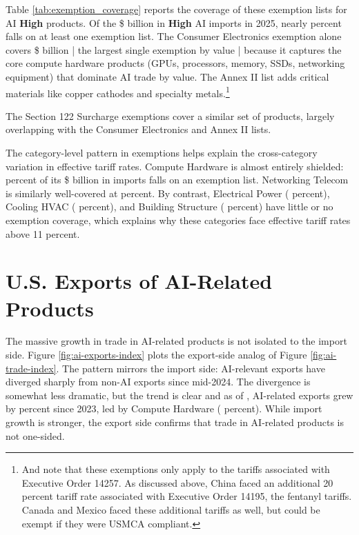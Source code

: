 \documentclass[12pt,pdftex]{article}
\begin{document}
\begin{onehalfspacing}
\afterpage{%
\clearpage

}

Table \ref{tab:exemption_coverage} reports the coverage of these exemption lists for AI \textbf{High} products. Of the \$\highAiTwentyFive{} billion in \textbf{High} AI imports in 2025, nearly \exemptionAnyPct{} percent falls on at least one exemption list. The Consumer Electronics exemption alone covers \$\exemptionCEDollars{} billion | the largest single exemption by value | because it captures the core compute hardware products (GPUs, processors, memory, SSDs, networking equipment) that dominate AI trade by value. The Annex II list adds critical materials like copper cathodes and specialty metals.\footnote{And note that these exemptions only apply to the tariffs associated with Executive Order 14257. As discussed above, China faced an additional 20 percent tariff rate associated with Executive Order 14195, the fentanyl tariffs. Canada and Mexico faced these additional tariffs as well, but could be exempt if they were USMCA compliant.} 

The Section 122 Surcharge exemptions cover a similar set of products, largely overlapping with the Consumer Electronics and Annex II lists.

The category-level pattern in exemptions helps explain the cross-category variation in effective tariff rates. Compute Hardware is almost entirely shielded: \exemptionComputeHardwarePct{} percent of its \$\ComputeHardwareTwentyFive{} billion in imports falls on an exemption list. Networking Telecom is similarly well-covered at \exemptionNetworkingTelecomPct{} percent. By contrast, Electrical Power (\exemptionElectricalPowerPct{} percent), Cooling HVAC (\exemptionCoolingHVACPct{} percent), and Building Structure (\exemptionBuildingStructurePct{} percent) have little or no exemption coverage, which explains why these categories face effective tariff rates above 11 percent.

\section{U.S. Exports of AI-Related Products}\label{sec:facts-exports}

The massive growth in trade in AI-related products is not isolated to the import side. Figure \ref{fig:ai-exports-index} plots the export-side analog of Figure \ref{fig:ai-trade-index}. The pattern mirrors the import side: AI-relevant exports have diverged sharply from non-AI exports since mid-2024. The divergence is somewhat less dramatic, but the trend is clear and as of \lastObsDate{}, AI-related exports grew by \aiExportGrowth{} percent since 2023, led by Compute Hardware (\computeHardwareExportGrowth{} percent). While import growth is stronger, the export side confirms that trade in AI-related products is not one-sided.


\end{onehalfspacing}
\end{document}
